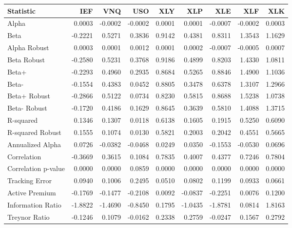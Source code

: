 \begin{tabular}{lrrrrrrrr}
\toprule
Statistic & IEF & VNQ & USO & XLY & XLP & XLE & XLF & XLK \\
\midrule
Alpha & 0.0003 & -0.0002 & -0.0002 & 0.0001 & 0.0001 & -0.0007 & -0.0002 & 0.0003 \\
Beta & -0.2221 & 0.5271 & 0.3836 & 0.9142 & 0.4381 & 0.8311 & 1.3543 & 1.1629 \\
Alpha Robust & 0.0003 & 0.0001 & 0.0012 & 0.0001 & 0.0002 & -0.0007 & -0.0005 & 0.0007 \\
Beta Robust & -0.2580 & 0.5231 & 0.3768 & 0.9186 & 0.4899 & 0.8203 & 1.4330 & 1.0811 \\
Beta+ & -0.2293 & 0.4960 & 0.2935 & 0.8684 & 0.5265 & 0.8846 & 1.4900 & 1.1036 \\
Beta- & -0.1554 & 0.4383 & 0.0452 & 0.8805 & 0.3478 & 0.6378 & 1.3107 & 1.2966 \\
Beta+ Robust & -0.2866 & 0.5122 & 0.0734 & 0.8230 & 0.5815 & 0.8688 & 1.5238 & 1.0738 \\
Beta- Robust & -0.1720 & 0.4186 & 0.1629 & 0.8645 & 0.3639 & 0.5810 & 1.4088 & 1.3715 \\
R-squared & 0.1346 & 0.1307 & 0.0118 & 0.6138 & 0.1605 & 0.1915 & 0.5250 & 0.6090 \\
R-squared Robust & 0.1555 & 0.1074 & 0.0130 & 0.5821 & 0.2003 & 0.2042 & 0.4551 & 0.5665 \\
Annualized Alpha & 0.0726 & -0.0382 & -0.0468 & 0.0249 & 0.0350 & -0.1553 & -0.0530 & 0.0696 \\
Correlation & -0.3669 & 0.3615 & 0.1084 & 0.7835 & 0.4007 & 0.4377 & 0.7246 & 0.7804 \\
Correlation p-value & 0.0000 & 0.0000 & 0.0859 & 0.0000 & 0.0000 & 0.0000 & 0.0000 & 0.0000 \\
Tracking Error & 0.0940 & 0.1006 & 0.2495 & 0.0510 & 0.0802 & 0.1199 & 0.0933 & 0.0661 \\
Active Premium & -0.1769 & -0.1477 & -0.2108 & 0.0092 & -0.0837 & -0.2251 & 0.0076 & 0.1200 \\
Information Ratio & -1.8822 & -1.4690 & -0.8450 & 0.1795 & -1.0435 & -1.8781 & 0.0814 & 1.8163 \\
Treynor Ratio & -0.1246 & 0.1079 & -0.0162 & 0.2338 & 0.2759 & -0.0247 & 0.1567 & 0.2792 \\
\bottomrule
\end{tabular}

